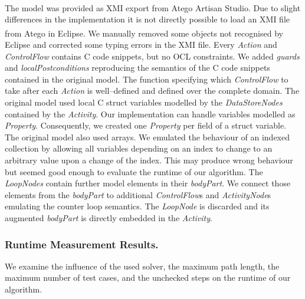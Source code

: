 \documentclass[runningheads,a4paper]{llncs}%
\newcommand{\UMLType}[1]{\textsf{\textit{#1}}} %
\newcommand{\UMLReference}[1]{\textsf{\textit{#1}}} %
\begin{document}
The model was provided as XMI export from Atego\textsuperscript{\textregistered}
Artisan Studio. Due to slight differences in the implementation it is not directly
possible to load an XMI file from Atego\textsuperscript{\textregistered} in
Eclipse. We manually removed some objects not recognised by Eclipse and
corrected some typing errors in the XMI file.
Every \UMLType{Action} and \UMLReference{ControlFlow} contains C code snippets,
but no OCL constraints. We added \UMLReference{guards} and
\UMLReference{localPostconditions} reproducing the semantics of the C code
snippets contained in the original model. The function specifying which \UMLType{ControlFlow} to take after each
\UMLType{Action} is well--defined and defined over the complete domain.
The original model used local C struct variables modelled by the
\UMLType{DataStoreNodes} contained by the \UMLType{Activity}. Our implementation
can handle variables modelled as \UMLType{Property}. Consequently, we created
one \UMLType{Property} per field of a struct variable. The original model also
used arrays. We emulated the behaviour of an indexed collection by allowing all
variables depending on an index to change to an arbitrary value upon a change of
the index. This may produce wrong behaviour but seemed good enough to evaluate
the runtime of our algorithm.
The \UMLType{LoopNodes} contain further model elements in their
\UMLReference{bodyPart}. We connect those elements from the
\UMLReference{bodyPart} to additional \UMLType{ControlFlow}s and
\UMLType{ActivityNode}s emulating the counter loop semantics. The
\UMLType{LoopNode} is discarded and its augmented \UMLReference{bodyPart} is
directly embedded in the \UMLType{Activity}.
\subsubsection{Runtime Measurement Results.}
We examine the influence of the used solver, the maximum path length, the
maximum number of test cases, and the unchecked steps on the runtime of our
algorithm.
\end{document}
